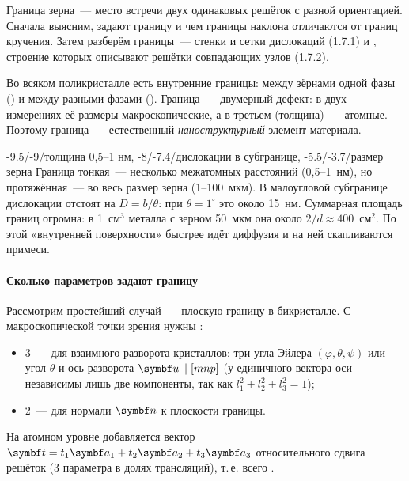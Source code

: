 \begin{orientir}
Граница зерна~— место встречи двух одинаковых решёток с разной
ориентацией. Сначала выясним,  задают границу и
чем границы наклона отличаются от границ кручения. Затем разберём
 границы~— стенки и сетки дислокаций (1.7.1) и
, строение которых описывают решётки совпадающих
узлов (1.7.2).
\end{orientir}

Во всяком поликристалле есть внутренние границы: между зёрнами одной фазы
() и между разными фазами ().
Граница~— двумерный дефект: в двух измерениях её размеры макроскопические,
а в третьем (толщина)~— атомные. Поэтому граница~— естественный
\emph{наноструктурный} элемент материала.

\begin{masshtab}{-9.5/-9/{толщина 0,5--1 нм}, -8/-7.4/{дислокации в субгранице}, -5.5/-3.7/{размер зерна}}
Граница тонкая~— несколько межатомных расстояний (0,5--1~нм), но
протяжённая~— во весь размер зерна (1--100~мкм). В малоугловой
субгранице дислокации отстоят на $D=b/\theta$: при $\theta=1^\circ$ это
около 15~нм. Суммарная площадь границ огромна: в 1~см$^3$ металла с
зерном 50~мкм она около $2/d\approx400$~см$^2$. По этой «внутренней
поверхности» быстрее идёт диффузия и на ней скапливаются примеси.
\end{masshtab}

\paragraph{Сколько параметров задают границу}
Рассмотрим простейший случай~— плоскую границу в бикристалле. С
макроскопической точки зрения нужны :
\begin{itemize}
\item 3~— для взаимного разворота кристаллов: три угла Эйлера
$(\varphi,\theta,\psi)$ или угол $\theta$ и ось разворота $\vb u\parallel[mnp]$
(у единичного вектора оси независимы лишь две компоненты, так как
$l_1^2+l_2^2+l_3^2=1$);
\item 2~— для нормали $\vb n$ к плоскости границы.
\end{itemize}
На атомном уровне добавляется вектор $\vb t=t_1\vb a_1+t_2\vb a_2+t_3\vb a_3$
относительного сдвига решёток (3 параметра в долях трансляций), т.\,е.
всего .

